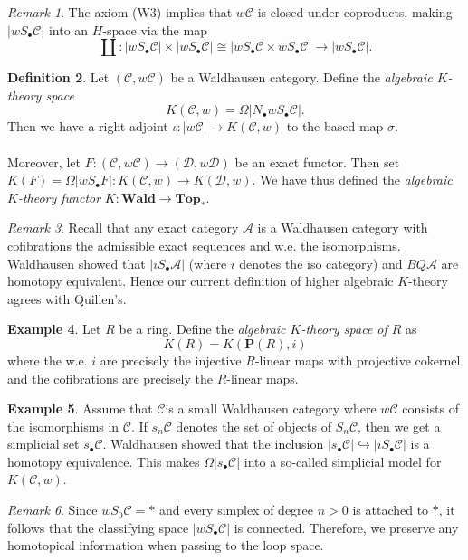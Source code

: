 \documentclass[10pt,letterpaper,cm]{nupset}
\theoremstyle{definition}
\newtheorem{definition}{Definition}
\newtheorem{exmp}[definition]{Example}
\theoremstyle{theorem}
\theoremstyle{remark}
\newtheorem{remark}[definition]{Remark}
\renewcommand{\P}{\mathbf P}
\newcommand{\1}{\mathbf{1}}
\renewcommand{\a}{\mathscr{A}}
\renewcommand{\c}{\mathscr{C}}
\renewcommand{\d}{\mathscr{D}}
\newcommand{\0}{\vec 0}
\begin{document}
\begin{remark}
The axiom (W3) implies that $w\c$ is closed under coproducts, making $|wS_{\bullet} \c|$ into an $H$-space via the map $$\coprod: |wS_{\bullet} \c| \times |wS_{\bullet} \c| \cong |wS_{\bullet} \c \times  wS_{\bullet} \c|\to |wS_{\bullet} \c|.$$
\end{remark}

\begin{definition}
Let $(\c, w\c)$ be a Waldhausen category. Define the \textit{algebraic $K$-theory space} $$K(\c, w) = \Omega | N_{\bullet} wS_{\bullet} \c|.$$ Then we have a right adjoint $\iota: |w \c | \to K(\c, w)$ to the based map $\sigma$.
\\ \\ Moreover,
let $F : (\c, w \c) \to (\d, w\d)$ be an exact functor. Then set $K(F) = \Omega | wS_{\bullet}F| : K(\c, w) \to K(\d, w)$. We have thus defined the \textit{algebraic $K$-theory functor} $K : \mathbf{Wald} \to \mathbf{Top_{\ast}}.$
\end{definition}

\begin{remark}
Recall that any exact category $\a$ is a Waldhausen category with cofibrations the admissible exact sequences and w.e. the isomorphisms. Waldhausen showed that $|iS_{\bullet}\a|$ (where $i$ denotes the iso category) and $BQ\a$ are homotopy equivalent. Hence our current definition of higher algebraic $K$-theory agrees with Quillen's.
\end{remark}

\begin{exmp}
Let $R$ be a ring. Define the \textit{algebraic $K$-theory space of $R$} as $$K(R) = K(\P(R), i)$$ where the w.e. $i$ are precisely the injective $R$-linear maps with projective cokernel and the cofibrations are precisely the $R$-linear maps.
\end{exmp}

\begin{exmp}
Assume that $\c$is a small Waldhausen category where $w\c$ consists of the isomorphisms in $\c$. If $s_n\c$ denotes the set of objects of $S_n \c$, then we get a simplicial set $s_{\bullet} \c$. Waldhausen showed that the inclusion $|s_{\bullet} \c| \hookrightarrow |iS_{\bullet} \c|$ is a homotopy equivalence. This makes $\Omega |s_{\bullet} \c|$ into a so-called simplicial model for $K(\c, w)$.
\end{exmp}

\begin{remark}
Since $wS_0 \c = \ast$ and every simplex of degree $n >0$ is attached to $\ast$, it follows that the classifying space $|w S_{\bullet} \c|$ is connected. Therefore, we preserve any homotopical information when passing to the loop space.
\end{remark}
\end{document}
